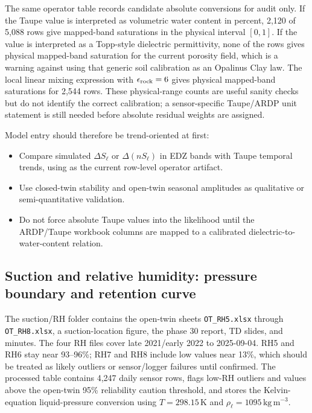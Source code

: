 The same operator table records candidate absolute conversions for audit only.  If
the Taupe value is interpreted as volumetric water content in percent, 2,120 of 5,088
rows give mapped-band saturations in the physical interval \([0,1]\).  If the value is
interpreted as a Topp-style dielectric permittivity, none of the rows gives physical
mapped-band saturation for the current porosity field, which is a warning against
using that generic soil calibration as an Opalinus Clay law.  The local linear mixing
expression with \(\epsilon_{\rm rock}=6\) gives physical mapped-band saturations for
2,544 rows.  These physical-range counts are useful sanity checks but do not identify
the correct calibration; a sensor-specific Taupe/ARDP unit statement is still needed
before absolute residual weights are assigned.

Model entry should therefore be trend-oriented at first:

\begin{itemize}[leftmargin=1.5em]
  \item Compare simulated \(\Delta S_\ell\) or \(\Delta(nS_\ell)\) in EDZ bands with
  Taupe temporal trends, using  as the current
  row-level operator artifact.
  \item Use closed-twin stability and open-twin seasonal amplitudes as qualitative or
  semi-quantitative validation.
  \item Do not force absolute Taupe values into the likelihood until the ARDP/Taupe
  workbook columns are mapped to a calibrated dielectric-to-water-content relation.
\end{itemize}

\subsection{Suction and relative humidity: pressure boundary and retention curve}

The suction/RH folder contains the open-twin sheets \texttt{OT\_RH5.xlsx} through
\texttt{OT\_RH8.xlsx}, a suction-location figure, the phase 30 report, TD slides, and
minutes.  The four RH files cover late 2021/early 2022 to 2025-09-04.  RH5 and RH6
stay near 93--96\%; RH7 and RH8 include low values near 13\%, which should be treated
as likely outliers or sensor/logger failures until confirmed.  The processed
 table contains 4,247 daily sensor rows, flags low-RH
outliers and values above the open-twin 95\% reliability caution threshold, and stores
the Kelvin-equation liquid-pressure conversion using \(T=298.15\,\mathrm{K}\) and
\(\rho_\ell=1095\,\mathrm{kg\,m^{-3}}\).

